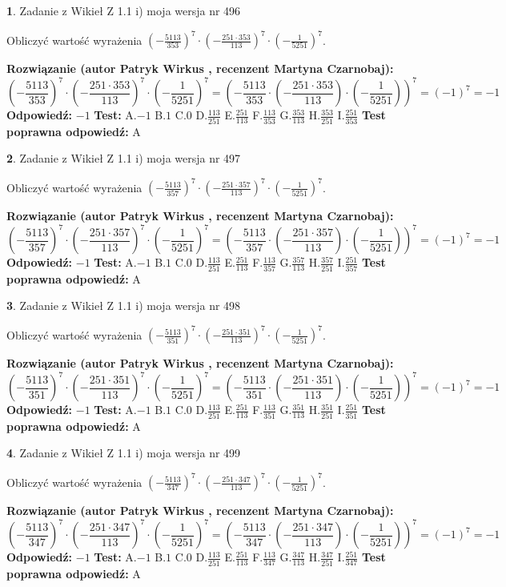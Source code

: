 \documentclass[12pt, a4paper]{article}
\theoremstyle{definition} %
\newtheorem{zad}{}
\newcommand{\zadStart}[1]{\begin{zad}#1\newline}
\newcommand{\zadStop}{\end{zad}}
\newcommand{\rozwStart}[2]{\noindent \textbf{Rozwiązanie (autor #1 , recenzent #2): }\newline}
\newcommand{\rozwStop}{\newline}
\newcommand{\odpStart}{\noindent \textbf{Odpowiedź:}\newline}
\newcommand{\odpStop}{\newline}
\newcommand{\testStart}{\noindent \textbf{Test:}\newline}
\newcommand{\testStop}{\newline}
\newcommand{\kluczStart}{\noindent \textbf{Test poprawna odpowiedź:}\newline}
\newcommand{\kluczStop}{\newline}
\begin{document}
\zadStart{Zadanie z Wikieł Z 1.1 i) moja wersja nr 496}

Obliczyć wartość wyrażenia $(-\frac{5113}{353})^{7} \cdot (-\frac{251 \cdot 353}{113})^{7} \cdot (-\frac{1}{5251})^{7}$.
\zadStop
\rozwStart{Patryk Wirkus}{Martyna Czarnobaj}
$$(-\frac{5113}{353})^{7} \cdot (-\frac{251 \cdot 353}{113})^{7} \cdot (-\frac{1}{5251})^{7} = (-\frac{5113}{353} \cdot (-\frac{251 \cdot 353}{113}) \cdot (-\frac{1}{5251}))^{7} = (-1)^{7} = -1$$
\rozwStop
\odpStart
$-1$
\odpStop
\testStart
A.$-1$ B.$1$ C.$0$ D.$\frac{113}{251}$ E.$\frac{251}{113}$
F.$\frac{113}{353}$ G.$\frac{353}{113}$
H.$\frac{353}{251}$
I.$\frac{251}{353}$
\testStop
\kluczStart
A
\kluczStop



\zadStart{Zadanie z Wikieł Z 1.1 i) moja wersja nr 497}

Obliczyć wartość wyrażenia $(-\frac{5113}{357})^{7} \cdot (-\frac{251 \cdot 357}{113})^{7} \cdot (-\frac{1}{5251})^{7}$.
\zadStop
\rozwStart{Patryk Wirkus}{Martyna Czarnobaj}
$$(-\frac{5113}{357})^{7} \cdot (-\frac{251 \cdot 357}{113})^{7} \cdot (-\frac{1}{5251})^{7} = (-\frac{5113}{357} \cdot (-\frac{251 \cdot 357}{113}) \cdot (-\frac{1}{5251}))^{7} = (-1)^{7} = -1$$
\rozwStop
\odpStart
$-1$
\odpStop
\testStart
A.$-1$ B.$1$ C.$0$ D.$\frac{113}{251}$ E.$\frac{251}{113}$
F.$\frac{113}{357}$ G.$\frac{357}{113}$
H.$\frac{357}{251}$
I.$\frac{251}{357}$
\testStop
\kluczStart
A
\kluczStop



\zadStart{Zadanie z Wikieł Z 1.1 i) moja wersja nr 498}

Obliczyć wartość wyrażenia $(-\frac{5113}{351})^{7} \cdot (-\frac{251 \cdot 351}{113})^{7} \cdot (-\frac{1}{5251})^{7}$.
\zadStop
\rozwStart{Patryk Wirkus}{Martyna Czarnobaj}
$$(-\frac{5113}{351})^{7} \cdot (-\frac{251 \cdot 351}{113})^{7} \cdot (-\frac{1}{5251})^{7} = (-\frac{5113}{351} \cdot (-\frac{251 \cdot 351}{113}) \cdot (-\frac{1}{5251}))^{7} = (-1)^{7} = -1$$
\rozwStop
\odpStart
$-1$
\odpStop
\testStart
A.$-1$ B.$1$ C.$0$ D.$\frac{113}{251}$ E.$\frac{251}{113}$
F.$\frac{113}{351}$ G.$\frac{351}{113}$
H.$\frac{351}{251}$
I.$\frac{251}{351}$
\testStop
\kluczStart
A
\kluczStop



\zadStart{Zadanie z Wikieł Z 1.1 i) moja wersja nr 499}

Obliczyć wartość wyrażenia $(-\frac{5113}{347})^{7} \cdot (-\frac{251 \cdot 347}{113})^{7} \cdot (-\frac{1}{5251})^{7}$.
\zadStop
\rozwStart{Patryk Wirkus}{Martyna Czarnobaj}
$$(-\frac{5113}{347})^{7} \cdot (-\frac{251 \cdot 347}{113})^{7} \cdot (-\frac{1}{5251})^{7} = (-\frac{5113}{347} \cdot (-\frac{251 \cdot 347}{113}) \cdot (-\frac{1}{5251}))^{7} = (-1)^{7} = -1$$
\rozwStop
\odpStart
$-1$
\odpStop
\testStart
A.$-1$ B.$1$ C.$0$ D.$\frac{113}{251}$ E.$\frac{251}{113}$
F.$\frac{113}{347}$ G.$\frac{347}{113}$
H.$\frac{347}{251}$
I.$\frac{251}{347}$
\testStop
\kluczStart
A
\kluczStop
\end{document}
